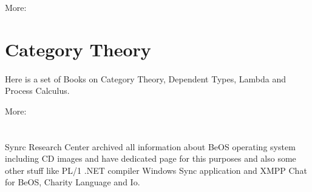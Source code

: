 \documentclass[11pt]{article}
\begin{document}
More: 


\section*{Category Theory}
\paragraph{}
Here is a set of Books on Category Theory, Dependent Types, Lambda and Process Calculus.

More: 

\section*{}
\paragraph{}
Synrc Research Center archived all information about BeOS operating system 
including CD images and have dedicated page for this purposes and also some
other stuff like PL/1 .NET compiler Windows Sync application and XMPP Chat for BeOS, Charity Language and Io.





\end{document}
